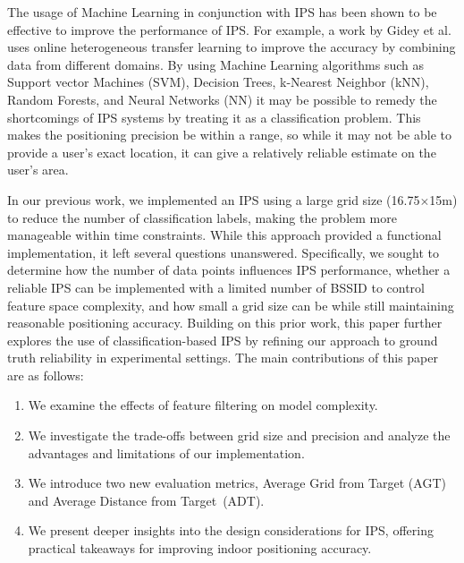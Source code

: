 \documentclass[runningheads]{llncs}
\begin{document}
The usage of Machine Learning in conjunction with IPS has been shown to be effective to improve the performance of IPS. For example, a work by Gidey et al. \cite{bgp3} uses online heterogeneous transfer learning to improve the accuracy by combining data from different domains. By using Machine Learning algorithms such as Support vector Machines (SVM), Decision Trees, k-Nearest Neighbor (kNN), Random Forests, and Neural Networks (NN) it may be possible to remedy the shortcomings of IPS systems by treating it as a classification problem. This makes the positioning precision be within a range, so while it may not be able to provide a user's exact location, it can give a relatively reliable estimate on the user's area.

In our previous work, we implemented an IPS using a large grid size (16.75$\times$15m) to reduce the number of classification labels, making the problem more manageable within time constraints. While this approach provided a functional implementation, it left several questions unanswered. Specifically, we sought to determine how the number of data points influences IPS performance, whether a reliable IPS can be implemented with a limited number of BSSID to control feature space complexity, and how small a grid size can be while still maintaining reasonable positioning accuracy.
Building on this prior work, this paper further explores the use of classification-based IPS by refining our approach to ground truth reliability in experimental settings. The main contributions of this paper are as follows:
\begin{enumerate}
	\item We examine the effects of feature filtering on model complexity.
	\item We investigate the trade-offs between grid size and precision and analyze the advantages and limitations of our implementation.
	\item We introduce two new evaluation metrics, Average Grid from Target (AGT) and Average Distance from Target~(ADT).
	\item We present deeper insights into the design considerations for IPS, offering practical takeaways for improving indoor positioning accuracy.
\end{enumerate}

\end{document}
